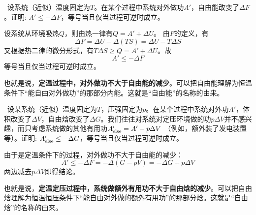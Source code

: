 \documentclass[CJK]{beamer}
\begin{document}
\begin{frame}
\bch
{\small
{\blue  设系统（近似）温度固定为$T$。在某个过程中系统对外做功$A'$，自由能改变了$\Delta F$。证明: $A'\le -\Delta F$，等号当且仅当过程可逆时成立。}

设系统从环境吸热$Q$，则由热一律有$Q = A' + \Delta U$。
由$F$的定义，有
$$\Delta F = \Delta U - \Delta (TS) = \Delta U - T\Delta S $$
又根据热二律的微分形式，有$T\Delta S \ge Q = A' +\Delta U$。故
$$A' \le - \Delta F$$
等号当且仅当过程可逆时成立。

也就是说，{\bf 定温过程中，对外做功不大于自由能的减少}。可以把自由能理解为恒温条件下“能自由对外做功”的那部分内能。这就是“自由能”的名称的由来。
}

\ech
\end{frame}

\begin{frame}
\bch

{\blue  设某系统（近似）温度固定为$T$，压强固定为$p$。在某个过程中系统对外功$A'$，体积改变了$\Delta V$，自由焓改变了$\Delta G$。我们往往对系统对定压环境做的功$p\Delta V$并不感兴趣，而只考虑系统做的其他有用功$A'_{\rm else} = A'-p\Delta V$ （例如，额外装了发电装置等）。证明: $A'_{\rm else}  \le -\Delta G$，等号当且仅当过程可逆时成立。}

由于是定温条件下的过程，对外做功不大于自由能的减少：
$$ A' \le - \Delta F = -\Delta (G- pV) = - \Delta G + p \Delta V$$
两边减去$p\Delta V$即得结论。

也就是说，{\bf 定温定压过程中，系统做额外有用功不大于自由焓的减少}。可以把自由焓理解为恒温恒压条件下“能自由对外做的额外有用功”的那部分焓。这就是“自由焓”的名称的由来。

\ech
\end{frame}
\end{document}
